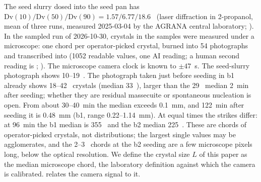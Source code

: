 The seed slurry dosed into the seed pan has $\mathrm{Dv}(10)/\mathrm{Dv}(50)/\mathrm{Dv}(90) = 1.57/6.77/18.6$~\um{}
(laser diffraction in 2-propanol, mean of three runs, measured 2025-03-04 by the AGRANA central laboratory;
\citealp{Mastersizer2025}). In the sampled run of 2026-10-30, crystals in the samples were measured under a
microscope: one chord per operator-picked crystal, burned into 54 photographs and transcribed into
 (1052 readable values, one AI reading; a human second reading is
; ). The microscope camera clock is known to
$\pm 47$~s. The seed-slurry photograph shows 10--19~\um. The photograph taken just before seeding in b1 already
shows 18--42~\um{} crystals (median 33~\um), larger than the 29~\um{} median 2~min after seeding; whether they are
residual massecuite or spontaneous nucleation is open. From about 30--40~min the median exceeds 0.1~mm, and 122~min
after seeding it is 0.48~mm (b1, range 0.22--1.14~mm). At equal times the strikes differ: at 96~min the b1 median is
355~\um{} and the b2 median 225~\um. These are chords of operator-picked crystals, not distributions; the largest
single values may be agglomerates, and the 2--3~\um{} chords at the b2 seeding are a few microscope pixels long,
below the optical resolution. We define the crystal size $L$ of this paper as the median microscope chord, the
laboratory definition against which the camera is calibrated.  relates the camera signal to
it.

